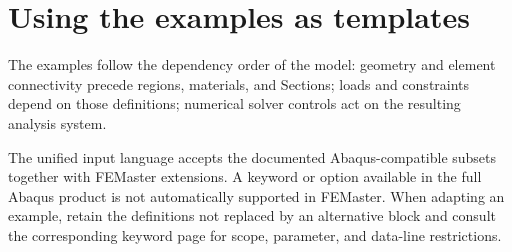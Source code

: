 \section{Using the examples as templates}

The examples follow the dependency order of the model: geometry and element connectivity precede regions, materials, and Sections; loads and constraints depend on those definitions; numerical solver controls act on the resulting analysis system.

The unified input language accepts the documented Abaqus-compatible
subsets together with FEMaster extensions. A keyword or option
available in the full Abaqus product is not automatically supported
in FEMaster. When adapting an example, retain the definitions not
replaced by an alternative block and consult the corresponding
keyword page for scope, parameter, and data-line restrictions.

